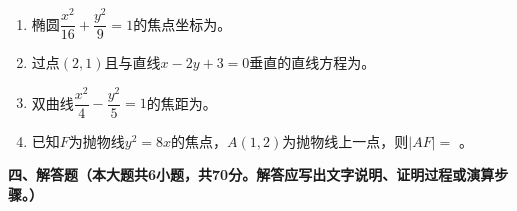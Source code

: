 \documentclass[12pt, a4paper]{ctexart}
\newcommand{\blank}[1]{\underline{\hspace{#1}}}
\begin{document}
\begin{enumerate}[start=13]
\item 椭圆$\dfrac{x^2}{16}+\dfrac{y^2}{9}=1$的焦点坐标为\blank{4cm}。

\item 过点$(2,1)$且与直线$x-2y+3=0$垂直的直线方程为\blank{4cm}。

\item 双曲线$\dfrac{x^2}{4}-\dfrac{y^2}{5}=1$的焦距为\blank{2cm}。

\item 已知$F$为抛物线$y^2=8x$的焦点，$A(1,2)$为抛物线上一点，则$|AF|=$ \blank{2cm}。
\end{enumerate}

\vspace{1em}

\noindent\textbf{四、解答题（本大题共6小题，共70分。解答应写出文字说明、证明过程或演算步骤。）}
\end{document}
